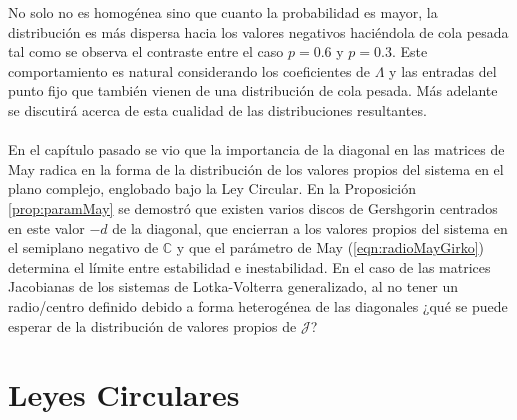 No solo no es homogénea sino que cuanto la probabilidad es mayor, la distribución es más dispersa hacia los valores negativos haciéndola de cola pesada tal como se observa el contraste entre el caso $p=0.6$ y $p=0.3$. Este comportamiento es natural considerando los coeficientes de $\Lambda$ y las entradas del punto fijo que también vienen de una distribución de cola pesada. Más adelante se discutirá acerca de esta cualidad de las distribuciones resultantes.
\\
\\
En el capítulo pasado se vio que la importancia de la diagonal en las matrices de May radica en la forma de la distribución de los valores propios del sistema en el plano complejo, englobado bajo la Ley Circular. En la Proposición \ref{prop:paramMay} se demostró que existen varios discos de Gershgorin centrados en este valor $-d$ de la diagonal, que encierran a los valores propios del sistema en el semiplano negativo de $\mathbb{C}$ y que el parámetro de May (\ref{eqn:radioMayGirko}) determina el límite entre estabilidad e inestabilidad. En el caso de las matrices Jacobianas de los sistemas de Lotka-Volterra generalizado, al no tener un radio/centro definido debido a forma heterogénea de las diagonales ¿qué se puede esperar de la distribución de valores propios de $\mathcal{J}$?
\newpage

\section{Leyes Circulares}

